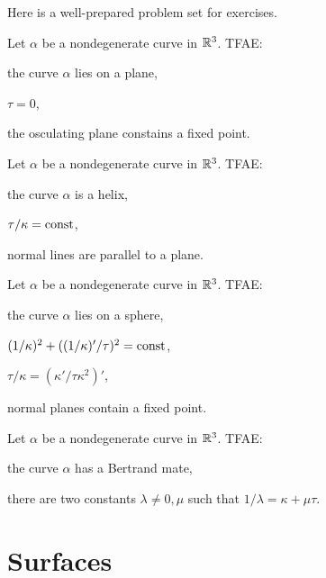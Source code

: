 \documentclass{../note}
\def\a{\alpha}
\begin{document}
Here is a well-prepared problem set for exercises.

\begin{prb}
Let $\a$ be a nondegenerate curve in $\mathbb{R}^3$.
TFAE:
\begin{parts}
\item the curve $\a$ lies on a plane,
\item $\tau=0$,
\item the osculating plane constains a fixed point.
\end{parts}
\end{prb}

\begin{prb}[Helices]
Let $\a$ be a nondegenerate curve in $\mathbb{R}^3$.
TFAE:
\begin{parts}
\item the curve $\a$ is a helix,
\item $\tau/\kappa=\operatorname{const}$,
\item normal lines are parallel to a plane.
\end{parts}
\end{prb}

\begin{prb}
Let $\a$ be a nondegenerate curve in $\mathbb{R}^3$.
TFAE:
\begin{parts}
\item the curve $\a$ lies on a sphere,
\item $(1/\kappa)^2+((1/\kappa)'/\tau)^2=\operatorname{const}$,
\item $\tau/\kappa=(\kappa'/\tau\kappa^2)'$,
\item normal planes contain a fixed point.
\end{parts}
\end{prb}

\begin{prb}
Let $\a$ be a nondegenerate curve in $\mathbb{R}^3$.
TFAE:
\begin{parts}
\item the curve $\a$ has a Bertrand mate,
\item there are two constants $\lambda\ne0,\mu$ such that $1/\lambda=\kappa+\mu\tau$.
\end{parts}
\end{prb}












\chapter{Surfaces}
\end{document}
